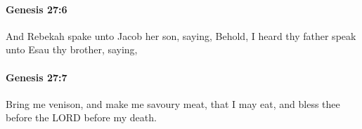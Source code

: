 		\paragraph{Genesis 27:6} %
			\label{GENESIS-27-6}

			And Rebekah spake unto Jacob her son, saying, Behold, I heard thy father speak unto Esau thy brother, saying,


		\paragraph{Genesis 27:7} %
			\label{GENESIS-27-7}

			Bring me venison, and make me savoury meat, that I may eat, and bless thee before the LORD before my death.


